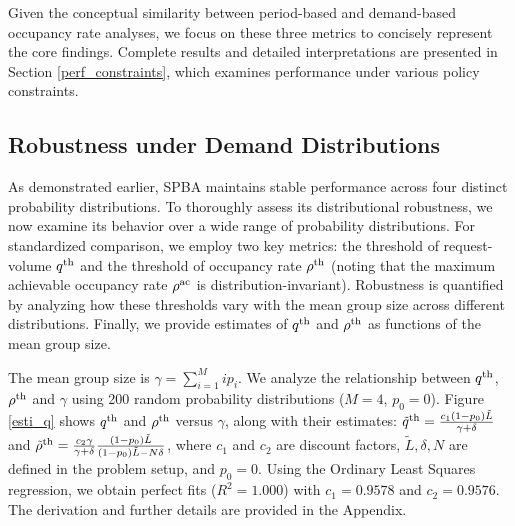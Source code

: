 Given the conceptual similarity between period-based and demand-based occupancy rate analyses, we focus on these three metrics to concisely represent the core findings. Complete results and detailed interpretations are presented in Section \ref{perf_constraints}, which examines performance under various policy constraints.


\subsection{Robustness under Demand Distributions}
As demonstrated earlier, SPBA maintains stable performance across four distinct probability distributions. To thoroughly assess its distributional robustness, we now examine its behavior over a wide range of probability distributions. For standardized comparison, we employ two key metrics: the threshold of request-volume $q^{\textup{th}}$ and the threshold of occupancy rate $\rho^{\textup{th}}$ (noting that the maximum achievable occupancy rate $\rho^{\textup{ac}}$ is distribution-invariant).
Robustness is quantified by analyzing how these thresholds vary with the mean group size across different distributions. Finally, we provide estimates of $q^{\textup{th}}$ and $\rho^{\textup{th}}$ as functions of the mean group size.


The mean group size is $\gamma = \sum_{i=1}^{M} i p_i$. We analyze the relationship between $q^{\textup{th}}$, $\rho^{\textup{th}}$ and $\gamma$ using 200 random probability distributions ($M=4$, $p_0=0$).
Figure \ref{esti_q} shows $q^{\textup{th}}$ and $\rho^{\textup{th}}$ versus $\gamma$, along with their estimates: 
$\tilde{q}^{\textup{th}} =  \frac{c_1 (1-p_0) \tilde{L}}{\gamma + \delta}$ and $\tilde{\rho}^{\textup{th}} = \frac{c_2 \gamma}{\gamma +\delta} \frac{(1-p_0) \tilde{L}}{(1-p_0) \tilde{L}-N \delta}$, where 
$c_1$ and $c_2$ are discount factors, $\tilde{L}, \delta, N$ are defined in the problem setup, and $p_0 =0$. Using the Ordinary Least Squares regression, we obtain perfect fits ($R^{2} = 1.000$) with $c_1 = 0.9578$ and $c_2 = 0.9576$. The derivation and further details are provided in the Appendix.


